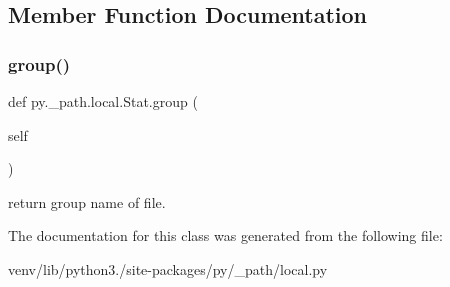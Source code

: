 \subsection{Member Function Documentation}
\mbox{\label{classpy_1_1__path_1_1local_1_1_stat_ad794bcdf382965b984801464d1b9d153}} 
\subsubsection{\texorpdfstring{group()}{group()}}
{\footnotesize\ttfamily def py.\+\_\+path.\+local.\+Stat.\+group (\begin{DoxyParamCaption}\item[{}]{self }\end{DoxyParamCaption})}

\begin{DoxyVerb}return group name of file. \end{DoxyVerb}
 

The documentation for this class was generated from the following file\+:\begin{DoxyCompactItemize}
\item 
venv/lib/python3./site-\/packages/py/\+\_\+path/local.\+py\end{DoxyCompactItemize}

